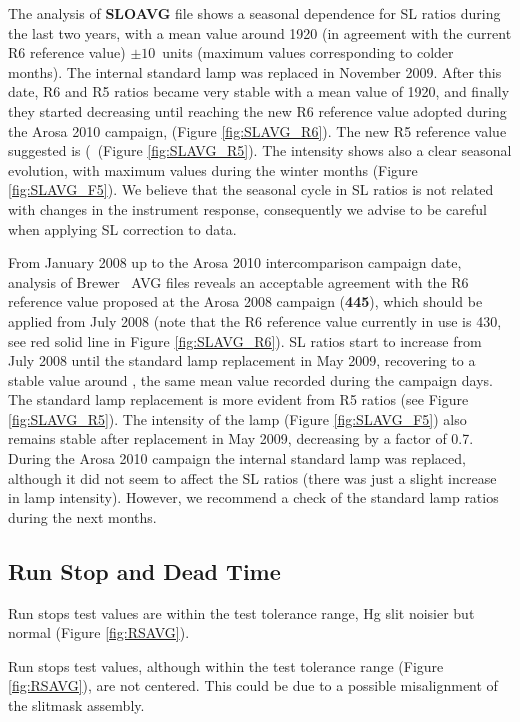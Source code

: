 The analysis of \textbf{SLOAVG} file shows a seasonal dependence for SL ratios during the last two years, with a mean value around 1920 (in agreement with the current R6 reference value) $\pm10$\ units (maximum values corresponding to colder months). The internal standard lamp was replaced in November 2009. After this date, R6 and R5 ratios became very stable with a mean value of 1920, and finally they started decreasing until reaching the new R6 reference value adopted during the Arosa 2010 campaign, \textbf{\slrefNEW} (Figure \ref{fig:SLAVG_R6}). The new R5 reference value suggested is (\textbf{\RcincoAVG}\ (Figure \ref{fig:SLAVG_R5}). The intensity shows also a clear seasonal evolution, with maximum values during the winter months (Figure \ref{fig:SLAVG_F5}). We believe that the seasonal cycle in SL ratios is not related with changes in the instrument response, consequently we advise to be careful when applying SL correction to data.

From January 2008 up to the Arosa 2010 intercomparison campaign date, analysis of Brewer \textbf{\brwname}\ \textsc{AVG} files reveals an acceptable agreement with the R6 reference value proposed at the Arosa 2008 campaign (\textbf{445}), which should be applied from July 2008 (note that the R6 reference value currently in use is 430, see red solid line in Figure \ref{fig:SLAVG_R6}). SL ratios start to increase from July 2008 until the standard lamp replacement in May 2009, recovering to a stable value around \textbf{\RseisAVG}, the same mean value recorded during the campaign days. The standard lamp replacement is more evident from R5 ratios (see Figure \ref{fig:SLAVG_R5}). The intensity of the lamp (Figure \ref{fig:SLAVG_F5}) also remains stable after replacement in May 2009, decreasing by a factor of 0.7. During the Arosa 2010 campaign the internal standard lamp was replaced, although it did not seem to affect the SL ratios (there was just a slight increase in lamp intensity). However, we recommend a check of the standard lamp ratios during the next months.

\subsection{Run Stop and Dead Time} \label{subsec:DT}
Run stops test values are within the test tolerance range, Hg slit noisier but normal (Figure \ref{fig:RSAVG}).

Run stops test values, although within the test tolerance range (Figure \ref{fig:RSAVG}), are not centered. This could be due to a possible misalignment of the slitmask assembly.

